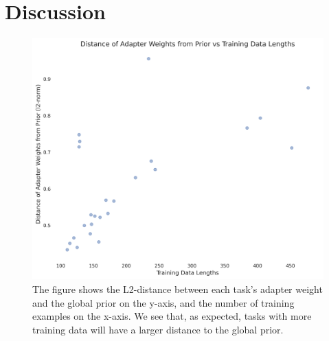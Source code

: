 \documentclass{article}
\begin{document}
\section{Discussion}
\begin{figure}[h]
    \centering
    \includegraphics[width=\textwidth]{figures/weights_vs_data_lengths.png}
    \caption{The figure shows the L2-distance between each task's adapter weight and the global prior on the y-axis, and the number of training examples on the x-axis. We see that, as expected, tasks with more training data will have a larger distance to the global prior.}
    \label{fig:weights_vs_datalen} 
\end{figure}
\end{document}
